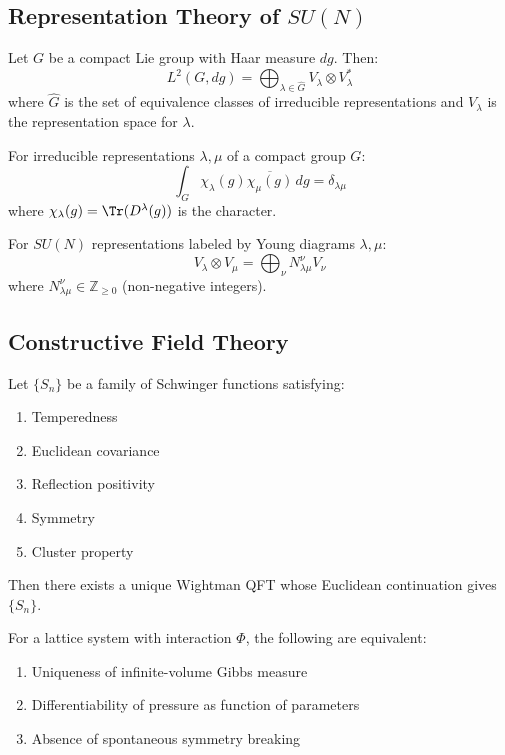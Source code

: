 \subsection{Representation Theory of \texorpdfstring{$SU(N)$}{SU(N)}}

\begin{theorem}
Let $G$ be a compact Lie group with Haar measure $dg$. Then:
\[
L^2(G, dg) = \bigoplus_{\lambda \in \hat{G}} V_\lambda \otimes V_\lambda^*
\]
where $\hat{G}$ is the set of equivalence classes of irreducible representations 
and $V_\lambda$ is the representation space for $\lambda$.
\end{theorem}

\begin{theorem}
For irreducible representations $\lambda, \mu$ of a compact group $G$:
\[
\int_G \chi_\lambda(g) \overline{\chi_\mu(g)} \, dg = \delta_{\lambda\mu}
\]
where $\chi_\lambda(g) = \Tr(D^\lambda(g))$ is the character.
\end{theorem}

\begin{theorem}
For $SU(N)$ representations labeled by Young diagrams $\lambda, \mu$:
\[
V_\lambda \otimes V_\mu = \bigoplus_\nu N_{\lambda\mu}^\nu V_\nu
\]
where $N_{\lambda\mu}^\nu \in \mathbb{Z}_{\geq 0}$ (non-negative integers).
\end{theorem}

\subsection{Constructive Field Theory}

\begin{theorem}
Let $\{S_n\}$ be a family of Schwinger functions satisfying:
\begin{enumerate}[label=(OS\arabic*)]
\item Temperedness
\item Euclidean covariance
\item Reflection positivity
\item Symmetry
\item Cluster property
\end{enumerate}
Then there exists a unique Wightman QFT whose Euclidean continuation gives $\{S_n\}$.
\end{theorem}

\begin{theorem}
For a lattice system with interaction $\Phi$, the following are equivalent:
\begin{enumerate}[label=(\roman*)]
\item Uniqueness of infinite-volume Gibbs measure
\item Differentiability of pressure as function of parameters
\item Absence of spontaneous symmetry breaking
\end{enumerate}
\end{theorem}

